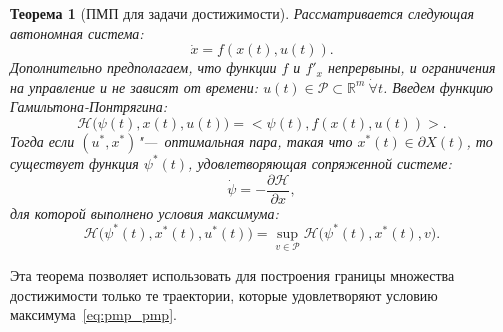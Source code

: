 \documentclass[12pt, a4paper]{article} %
\newtheorem{Th}{Теорема}
\newcommand{\Real}{\mathbb{R}}
\newcommand{\inner}[2]{\bigl< #1, #2 \bigr>}
\begin{document}
\begin{Th}[ПМП для задачи достижимости]\label{th:pmp}
    Рассматривается следующая автономная система:
    \begin{equation}\label{eq:pmp_sys}
        \dot x = f(x(t), u(t)).
    \end{equation} 
    Дополнительно предполагаем, что функции $f$ и $f'_x$ непрервыны,
    и ограничения на управление и не зависят от времени:
    $u(t) \in \mathcal{P} \subset \Real^{m}\ \dot \forall t$.
    Введем функцию Гамильтона-Понтрягина:
    \begin{equation}\label{eq:pmp_ham}
        \mathcal{H} \bigl( \psi(t), x(t), u(t) \bigr) = 
        \inner{\psi(t)}{f( x(t), u(t) )}.
    \end{equation} 
    Тогда если $(u^*, x^*)$"---~оптимальная пара,
    такая что  $x^*(t) \in \partial X(t)$, то существует функция $\psi^*(t)$,
    удовлетворяющая сопряженной системе:
    \begin{equation}\label{pmp_conj}
        \dot \psi = -\frac{\partial \mathcal{H}}{\partial x},
    \end{equation} 
    для которой выполнено условия максимума:
    \begin{equation}\label{eq:pmp_pmp}
         \mathcal{H} \bigl(\psi^*(t), x^*(t), u^*(t)\bigr) = 
         \sup\limits_{v \in \mathcal{P}} \mathcal{H} \bigl(\psi^*(t), x^*(t), v\bigr).
    \end{equation} 
\end{Th} 
Эта теорема позволяет использовать для построения границы множества
достижимости только те траектории, которые удовлетворяют условию максимума~\eqref{eq:pmp_pmp}.




 
\end{document}
